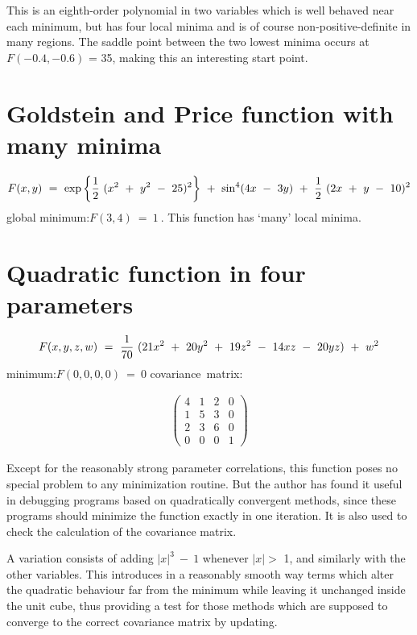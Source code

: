 \vskip2mm
 
     This is an eighth-order polynomial in two variables which is well
behaved near each minimum, but has four local minima and is of course
non-positive-definite in many regions.  The saddle point between the two
lowest minima occurs at $F(-0.4,-0.6)$ = 35, making this an interesting
start point.\\ 
 
 
 \section{Goldstein and Price function with many minima}
 
 
$$F(x,y)~=~\exp \left\{{1\over 2}~(x^2~+~y^2~-~25)^2\right\}~+~\sin^4 (4x~-~3y)~+~{1\over 2}~
(2x~+~y~-~10)^2$$  
 \noindent
 global minimum:{\phantom{xxxxxxxxxxxxxxxxxx}}$F  (3,4)~=~1~.$\vskip2mm \noindent
      This function has `many' local minima.\\ 
 
 
\section{Quadratic function in four parameters}
 
 
 
        $$F(x,y,z,w)~=~{1\over 70}~(21x^2~+~20y^2~+~19z^2~-~14xz~-~20yz)~+~w^2$$
\noindent 
minimum:{\phantom{xxxxxxxxxxxxxxxxxxx}}$ F(0,0,0,0)~=~0$                          
\vskip1cm
\noindent
 covariance~matrix:
 
\hskip10cm
\vskip-2.2cm
\begin{eqnarray*}
\left(\begin{array}{cccc}4&1&2&0\\
1&5&3&0\\
2&3&6&0\\
0&0&0&1
\end{array}
\right)
\end{eqnarray*}
 
     Except for the reasonably strong parameter correlations, this function
poses no special problem to any minimization routine.  But the
author has found it useful in debugging programs based on quadratically
convergent methods, since these programs should minimize the function
exactly in one iteration.  It is also used to check the calculation of
the covariance matrix.
 
     A variation consists of adding $|x|^3~-~1$ whenever $|x| >$ 1, and
similarly with the other variables.  This introduces in a reasonably
smooth way terms which alter the quadratic behaviour far from the
minimum
while leaving it unchanged inside the unit cube, thus providing a test
for those methods which are supposed to converge to the correct
covariance matrix by updating.
 
